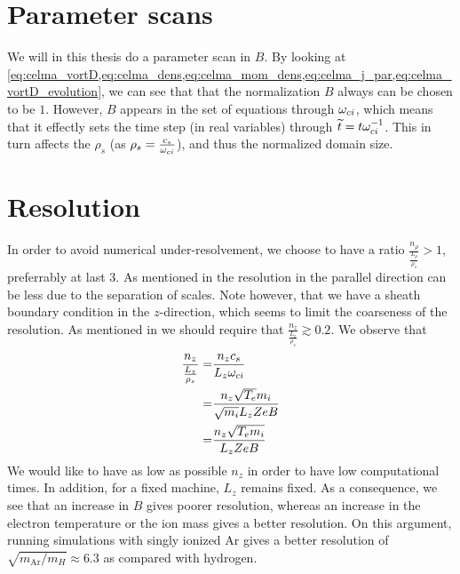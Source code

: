 \section{Parameter scans}
%
We will in this thesis do a parameter scan in $B$.
By looking at \cref{eq:celma_vortD,eq:celma_dens,eq:celma_mom_dens,eq:celma_j_par,eq:celma_vortD_evolution}, we can see that that the normalization $B$ always can be chosen to be $1$.
However, $B$ appears in the set of equations through $\omega_{ci}$, which means that it effectly sets the time step (in real variables) through $\widetilde{ t}=t\omega_{ci}^{-1}$.
This in turn affects the $\rho_s$ (as $\rho_s=\frac{c_s}{\omega_{ci}}$), and thus the normalized domain size.

\section{Resolution}
%
In order to avoid numerical under-resolvement, we choose to have a ratio $\frac{n_\rho}{\frac{L_\rho}{\rho_s}}>1$, preferrably at last $3$.
As mentioned in
the resolution in the parallel direction can be less due to the separation of scales.
Note however, that we have a sheath boundary condition in the $z$-direction, which seems to limit the coarseness of the resolution.
As mentioned in
we should require that $\frac{n_z}{\frac{L_z}{\rho_s}}\gtrsim0.2$.
We observe that
%
\begin{align*}
    \frac{n_z}{\frac{L_z}{\rho_s}}
    =& \frac{n_zc_s}{L_z \omega_{ci}}
    \\
    =& \frac{n_z\sqrt{T_e}m_i}{\sqrt{m_i} L_z ZeB}
    \\
    =& \frac{n_z\sqrt{T_em_i}}{L_z ZeB}
\end{align*}
%
We would like to have as low as possible $n_z$ in order to have low computational times.
In addition, for a fixed machine, $L_z$ remains fixed.
As a consequence, we see that an increase in $B$ gives poorer resolution, whereas an increase in the electron temperature or the ion mass gives a better resolution.
On this argument, running simulations with singly ionized Ar gives a better resolution of $\sqrt{m_{\text{Ar}}/m_H}\approx6.3$ as compared with hydrogen.
